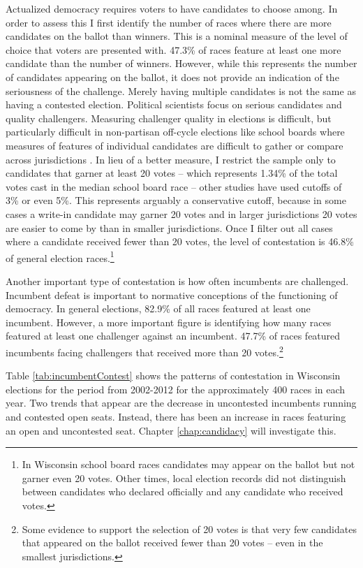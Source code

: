 Actualized democracy requires voters to have candidates to choose among. 
In order to assess this I first identify the number of races where 
there are more candidates on the ballot than winners. This is a nominal measure 
of the level of choice that voters are presented with. 47.3\% 
of races feature at least one more candidate than the number of winners. However, 
while this represents the number of candidates appearing on the ballot, it does 
not provide an indication of the seriousness of the challenge. Merely having  
multiple candidates is not the same as having a contested election. Political scientists 
focus on serious candidates and quality challengers. Measuring challenger quality 
in elections is difficult, but particularly difficult in non-partisan 
off-cycle elections like school boards where measures of features of individual 
candidates are difficult to gather or compare across jurisdictions \citep{oliver12}. 
In lieu of a better measure, I restrict the sample only to candidates that garner at least 20 votes -- which represents 1.34\% of the total votes cast in the median school board race -- other studies have used cutoffs of 3\% or even 5\%. This represents arguably a conservative cutoff, because in some cases a write-in candidate may garner 20 votes and in larger jurisdictions 20 votes are easier to come by than in smaller jurisdictions. Once I filter out all cases where a candidate received fewer than 20 votes, the level of contestation is 46.8\% of general election races.\footnote{In Wisconsin 
school board races candidates may appear on the ballot but not garner even 20 votes. Other times, local election records did not distinguish between candidates who declared officially and any candidate who received votes.}



Another important type of contestation is how often incumbents are challenged. 
Incumbent defeat is important to normative conceptions of the functioning of 
democracy. In general elections, 82.9\% of all races featured at least one incumbent. However, a 
more important figure is identifying how many races featured at least one challenger 
against an incumbent. 47.7\% of races featured 
incumbents facing challengers that received more than 20 votes.\footnote{Some evidence to support the selection of 20 votes is that very few 
candidates that appeared on the ballot received fewer than 20 votes -- even in the 
smallest jurisdictions.} %

Table \ref{tab:incumbentContest} shows the patterns of contestation in Wisconsin 
elections for the period from 2002-2012 for the approximately 400 races in each 
year. Two trends that appear are the decrease in uncontested incumbents running 
and contested open seats. Instead, there has been an increase in races featuring 
an open and uncontested seat. Chapter \ref{chap:candidacy} will investigate this.

